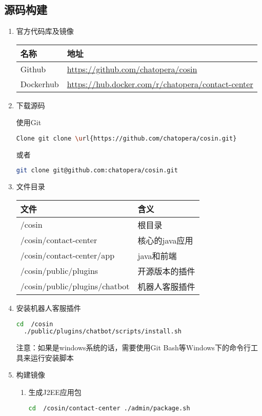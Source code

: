 \documentclass{article}
\begin{document}
\hypertarget{ux6e90ux7801ux6784ux5efa}{%
\subsection{源码构建}\label{ux6e90ux7801ux6784ux5efa}}

\begin{enumerate}
\item
  官方代码库及镜像

  \begin{longtable}[]{@{}ll@{}}
  \toprule
  名称 & 地址\tabularnewline
  \midrule
  \endhead
  Github & \url{https://github.com/chatopera/cosin}\tabularnewline
  Dockerhub &
  \url{https://hub.docker.com/r/chatopera/contact-center}\tabularnewline
  \bottomrule
  \end{longtable}
\item
  下载源码

  使用Git
\begin{lstlisting}[language={bash}]
  Clone git clone \url{https://github.com/chatopera/cosin.git}
\end{lstlisting}

或者
\begin{lstlisting}[language={bash}]
git clone git@github.com:chatopera/cosin.git
\end{lstlisting}

\item
  文件目录

  \begin{longtable}[]{@{}ll@{}}
  \toprule
  文件 & 含义\tabularnewline
  \midrule
  \endhead
   /cosin & 根目录\tabularnewline
   /cosin/contact-center & 核心的java应用\tabularnewline
   /cosin/contact-center/app & java和前端\tabularnewline
   /cosin/public/plugins & 开源版本的插件\tabularnewline
   /cosin/public/plugins/chatbot &
  机器人客服插件\tabularnewline
  \bottomrule
  \end{longtable}
\item
  安装机器人客服插件
\begin{lstlisting}[language={bash}]
  cd  /cosin
  ./public/plugins/chatbot/scripts/install.sh
\end{lstlisting}

  注意：如果是windows系统的话，需要使用Git
  Bash等Windows下的命令行工具来运行安装脚本
\item
  构建镜像

  \begin{enumerate}
  \item
    生成J2EE应用包
\begin{lstlisting}[language={bash}]
    cd  /cosin/contact-center ./admin/package.sh
\end{lstlisting}


\end{enumerate}
\end{enumerate}
\end{document}
